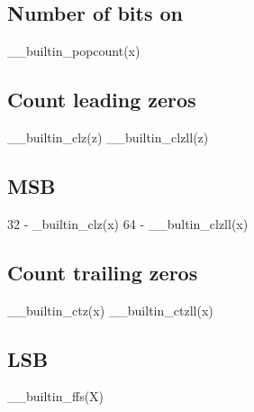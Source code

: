 \subsection{Number of bits on}
__builtin_popcount(x)
\subsection{Count leading zeros}
__builtin_clz(z)
__builtin_clzll(z)
\subsection{MSB}
32 - _builtin_clz(x)
64 - __bultin_clzll(x)
\subsection{Count trailing zeros}
__builtin_ctz(x)
__builtin_ctzll(x)
\subsection{LSB}
__builtin_ffs(X)
